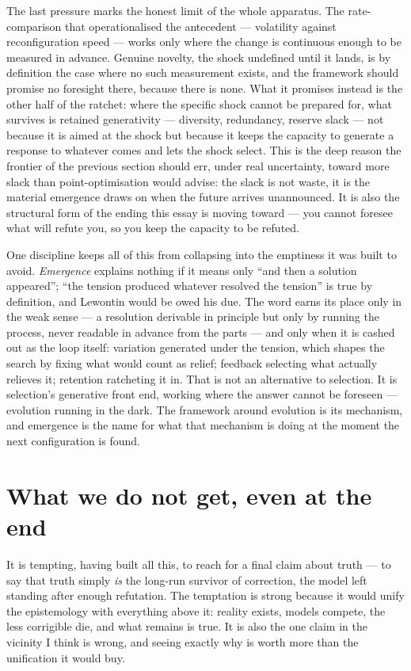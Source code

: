 \documentclass[11pt, a4paper]{report}
\begin{document}
The last pressure marks the honest limit of the whole apparatus. The rate-comparison that operationalised the antecedent --- volatility against reconfiguration speed --- works only where the change is continuous enough to be measured in advance. Genuine novelty, the shock undefined until it lands, is by definition the case where no such measurement exists, and the framework should promise no foresight there, because there is none. What it promises instead is the other half of the ratchet: where the specific shock cannot be prepared for, what survives is retained generativity --- diversity, redundancy, reserve slack --- not because it is aimed at the shock but because it keeps the capacity to generate a response to whatever comes and lets the shock select. This is the deep reason the frontier of the previous section should err, under real uncertainty, toward more slack than point-optimisation would advise: the slack is not waste, it is the material emergence draws on when the future arrives unannounced. It is also the structural form of the ending this essay is moving toward --- you cannot foresee what will refute you, so you keep the capacity to be refuted.

One discipline keeps all of this from collapsing into the emptiness it was built to avoid. \textit{Emergence} explains nothing if it means only ``and then a solution appeared''; ``the tension produced whatever resolved the tension'' is true by definition, and Lewontin would be owed his due. The word earns its place only in the weak sense --- a resolution derivable in principle but only by running the process, never readable in advance from the parts --- and only when it is cashed out as the loop itself: variation generated under the tension, which shapes the search by fixing what would count as relief; feedback selecting what actually relieves it; retention ratcheting it in. That is not an alternative to selection. It is selection's generative front end, working where the answer cannot be foreseen --- evolution running in the dark. The framework around evolution is its mechanism, and emergence is the name for what that mechanism is doing at the moment the next configuration is found.

\section{What we do not get, even at the end}

It is tempting, having built all this, to reach for a final claim about truth --- to say that truth simply \textit{is} the long-run survivor of correction, the model left standing after enough refutation. The temptation is strong because it would unify the epistemology with everything above it: reality exists, models compete, the less corrigible die, and what remains is true. It is also the one claim in the vicinity I think is wrong, and seeing exactly why is worth more than the unification it would buy.
\end{document}
